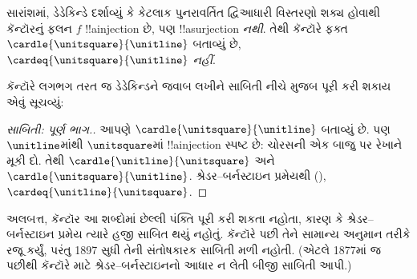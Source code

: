 \documentclass[../../../include/open-logic-section]{subfiles}
\begin{document}
સારાંશમાં, ડેડેકિન્ડે દર્શાવ્યું
કે કેટલાક પુનરાવર્તિત
દ્વિઆધારી વિસ્તરણો શક્ય હોવાથી
કૅન્ટૉરનું ફલન $f$
!!a{injection} છે, પણ
!!a{surjection} \emph{નથી}.
તેથી કૅન્ટૉરે ફક્ત
$\cardle{\unitsquare}{\unitline}$
બતાવ્યું છે,
$\cardeq{\unitsquare}{\unitline}$
\emph{નહીં}.

કૅન્ટૉરે લગભગ તરત જ
ડેડેકિન્ડને જવાબ લખીને
સાબિતી નીચે મુજબ
પૂરી કરી શકાય એવું સૂચવ્યું:

\begin{proof}[સાબિતી: પૂર્ણ ભાગ.]
આપણે $\cardle{\unitsquare}{\unitline}$
બતાવ્યું છે. પણ $\unitline$માંથી
$\unitsquare$માં !!a{injection}
સ્પષ્ટ છે: ચોરસની એક બાજુ
પર રેખાને મૂકી દો. તેથી
$\cardle{\unitline}{\unitsquare}$ અને
$\cardle{\unitsquare}{\unitline}$. શ્રેડર--બર્નસ્ટાઇન પ્રમેયથી
(),
$\cardeq{\unitline}{\unitsquare}$.
\end{proof}

અલબત્ત, કૅન્ટૉર આ શબ્દોમાં
છેલ્લી પંક્તિ પૂરી કરી શકતા
નહોતા, કારણ કે શ્રેડર--બર્નસ્ટાઇન
પ્રમેય ત્યારે હજી સાબિત થયું
નહોતું. કૅન્ટૉરે પછી તેને
સામાન્ય અનુમાન તરીકે રજૂ કર્યું,
પરંતુ 1897 સુધી તેની
સંતોષકારક સાબિતી મળી નહોતી.
(એટલે 1877માં જ પછીથી
કૅન્ટૉરે 
માટે શ્રેડર--બર્નસ્ટાઇનનો
આધાર ન લેતી બીજી
સાબિતી આપી.)
\end{document}
